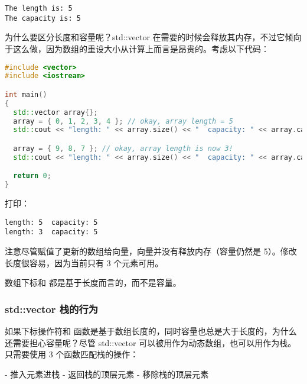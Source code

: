 \documentclass[../../LearnCpp.tex]{subfiles}
\begin{document}
\begin{lstlisting}
The length is: 5
The capacity is: 5
\end{lstlisting}

为什么要区分长度和容量呢？std::vector 在需要的时候会释放其内存，不过它倾向于这么做，因为数组的重设大小从计算上而言是昂贵的。考虑以下代码：

\begin{lstlisting}[language=C++]
#include <vector>
#include <iostream>

int main()
{
  std::vector array{};
  array = { 0, 1, 2, 3, 4 }; // okay, array length = 5
  std::cout << "length: " << array.size() << "  capacity: " << array.capacity() << '\n';

  array = { 9, 8, 7 }; // okay, array length is now 3!
  std::cout << "length: " << array.size() << "  capacity: " << array.capacity() << '\n';

  return 0;
}
\end{lstlisting}

打印：

\begin{lstlisting}
length: 5  capacity: 5
length: 3  capacity: 5
\end{lstlisting}

注意尽管赋值了更新的数组给向量，向量并没有释放内存（容量仍然是 5）。修改长度很容易，因为当前只有 3 个元素可用。

数组下标和  都是基于长度而言的，而不是容量。

\subsubsection*{std::vector 栈的行为}

如果下标操作符和  函数是基于数组长度的，同时容量也总是大于长度的，为什么还需要担心容量呢？尽管 std::vector 可以被用作为动态数组，也可以用作为栈。只需要使用 3 个函数匹配栈的操作：

-  推入元素进栈
-  返回栈的顶层元素
-  移除栈的顶层元素
\end{document}
